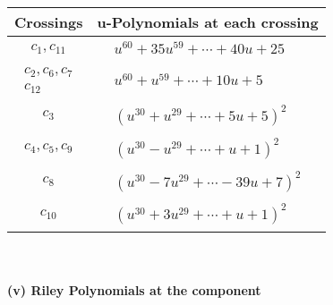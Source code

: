 \documentclass[1p]{elsarticle_modified}
\theoremstyle{definition}
\begin{document}
\begin{tabular}{m{50pt}|m{274pt}}
Crossings & \hspace{64pt}u-Polynomials at each crossing \\
\hline $$\begin{aligned}c_{1},c_{11}\end{aligned}$$&$\begin{aligned}
&u^{60}+35 u^{59}+\cdots+40 u+25
\end{aligned}$\\
\hline $$\begin{aligned}c_{2},c_{6},c_{7}\\c_{12}\end{aligned}$$&$\begin{aligned}
&u^{60}+u^{59}+\cdots+10 u+5
\end{aligned}$\\
\hline $$\begin{aligned}c_{3}\end{aligned}$$&$\begin{aligned}
&(u^{30}+u^{29}+\cdots+5 u+5)^{2}
\end{aligned}$\\
\hline $$\begin{aligned}c_{4},c_{5},c_{9}\end{aligned}$$&$\begin{aligned}
&(u^{30}- u^{29}+\cdots+u+1)^{2}
\end{aligned}$\\
\hline $$\begin{aligned}c_{8}\end{aligned}$$&$\begin{aligned}
&(u^{30}-7 u^{29}+\cdots-39 u+7)^{2}
\end{aligned}$\\
\hline $$\begin{aligned}c_{10}\end{aligned}$$&$\begin{aligned}
&(u^{30}+3 u^{29}+\cdots+u+1)^{2}
\end{aligned}$\\
\hline
\end{tabular}\\~\\
\newpage\renewcommand{\arraystretch}{1}
\flushleft \textbf{(v) Riley Polynomials at the component}\newline \\
\end{document}
